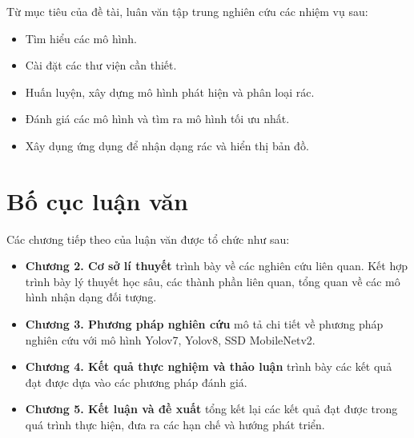 \documentclass[../the.tex]{subfiles}
\begin{document}
{\fontsize{13}{12} \selectfont
Từ mục tiêu của đề tài, luân văn tập trung nghiên cứu các nhiệm vụ sau:
\begin{itemize}
  \item Tìm hiểu các mô hình.
  \item Cài đặt các thư viện cần thiết.
  \item Huấn luyện, xây dựng mô hình phát hiện và phân loại rác.
  \item Đánh giá các mô hình và tìm ra mô hình tối ưu nhất.
  \item Xây dụng ứng dụng để nhận dạng rác và hiển thị bản đồ.
\end{itemize}
}

\section{Bố cục luận văn}
\label{bo_cuc}

{\fontsize{13}{12} \selectfont
Các chương tiếp theo của luận văn được tổ chức như sau:

\begin{itemize}
  \item \textbf{Chương 2. Cơ sở lí thuyết} trình bày về các nghiên cứu liên quan. Kết hợp trình bày lý thuyết học sâu, các thành phần liên quan, tổng quan về các mô hình nhận dạng đối tượng.
  \item \textbf{Chương 3. Phương pháp nghiên cứu} mô tả chi tiết về phương pháp nghiên cứu với mô hình Yolov7, Yolov8, SSD MobileNetv2.
  \item \textbf{Chương 4. Kết quả thực nghiệm và thảo luận} trình bày các kết quả đạt được dựa vào các phương pháp đánh giá.
  \item \textbf{Chương 5. Kết luận và đề xuất} tổng kết lại các kết quả đạt được trong quá trình thực hiện, đưa ra các hạn chế và hướng phát triển.
\end{itemize}
}
\bigskip





\end{document}
